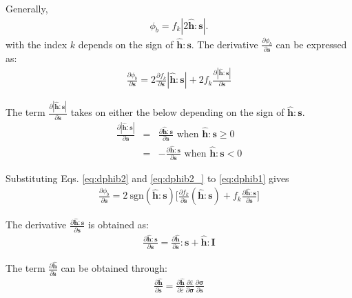 \documentclass[12pt]{amsart}
\begin{document}
Generally,
\begin{eqnarray}
    \label{eq:fluc1}
\phi_b  =f_k|2\hat{\mathbf{h}}:\mathbf{s}|.
\end{eqnarray}
with the index $k$ depends on the sign of $\hat{\mathbf{h}}:\mathbf{s}$.
The derivative $\frac{\partial{\phi_b}}{\partial{\mathbf{s}}}$ can be expressed as:
\begin{eqnarray}
    \label{eq:dphib1}
\frac{\partial{\phi_b}}{\partial{\mathbf{s}}} = 2\frac{\partial{f_k}}{\partial{\mathbf{s}}} |\hat{\mathbf{h}}:\mathbf{s}| + 2 f_k \frac{\partial{|\hat{\mathbf{h}}:\mathbf{s}|}}{\partial{\mathbf{s}}}
\end{eqnarray}

The term $\frac{\partial{|\hat{\mathbf{h}}:\mathbf{s}|}}{\partial{\mathbf{s}}}$ takes on either the below depending on the sign of $\hat{\mathbf{h}}:\mathbf{s}$.
\begin{eqnarray}
  \label{eq:dphib2}
  \frac{\partial{|\hat{\mathbf{h}}:\mathbf{s}|}}{\partial{\mathbf{s}}} &=&  \frac{\partial{\hat{\mathbf{h}}:\mathbf{s}}}{\partial{\mathbf{s}}}   \text{  when } \hat{\mathbf{h}}:\mathbf{s}\ge0\\
  \label{eq:dphib2_}
                                                                       &=& -\frac{\partial{\hat{\mathbf{h}}:\mathbf{s}}}{\partial{\mathbf{s}}}   \text{  when } \hat{\mathbf{h}}:\mathbf{s} < 0
\end{eqnarray}

Substituting Eqs. \ref{eq:dphib2} and \ref{eq:dphib2_} to \ref{eq:dphib1} gives
\begin{eqnarray}
  \label{eq:dphib1_}
  \frac{\partial{\phi_b}}{\partial{\mathbf{s}}} = 2\ \text{sgn}(\hat{\mathbf{h}}:\mathbf{s}) \bigg[  \frac{\partial{f_k}}{\partial{\mathbf{s}}} (\hat{\mathbf{h}}:\mathbf{s}) + f_k \frac{\partial{\hat{\mathbf{h}}:\mathbf{s}}}{\partial{\mathbf{s}}} \bigg]
\end{eqnarray}


The derivative  $\frac{\partial{\hat{\mathbf{h}}:\mathbf{s}}}{\partial{\mathbf{s}}}$ is obtained as:
\begin{eqnarray}
  \label{eq:dphib3}
\frac{\partial{\hat{\mathbf{h}}:\mathbf{s}}}{\partial{\mathbf{s}}}   =   \frac{\partial{\hat{\mathbf{h}}}}{\partial{\mathbf{s}}} : \mathbf{s} +\hat{\mathbf{h}}:\mathbf{I}
\end{eqnarray}

The term $ \frac{\partial{\hat{\mathbf{h}}}}{\partial{\mathbf{s}}} $ can be obtained through:
\begin{eqnarray}
  \label{eq:dphib4}
\frac{\partial{\hat{\mathbf{h}}}}{\partial{\mathbf{s}}}=\frac{\partial{\hat{\mathbf{h}}}}{\partial{\bar{\varepsilon}}}   \frac{\partial{\bar{\varepsilon}}}{\partial{\mathbf{\sigma}}}    \frac{\partial{\mathbf{\sigma}}}{\partial{\mathbf{s}}}
\end{eqnarray}
\end{document}
